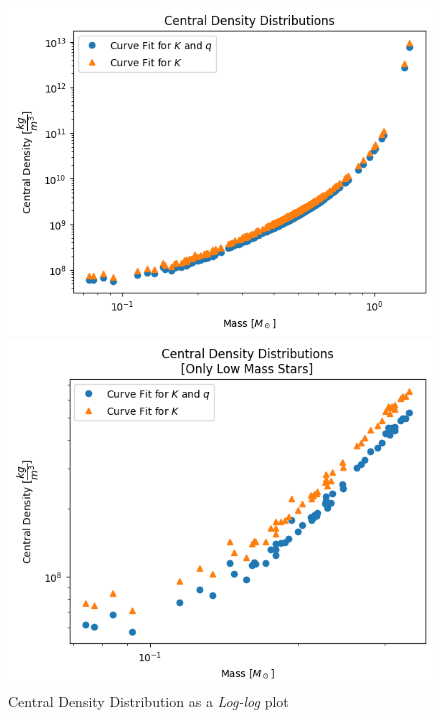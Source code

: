 \documentclass[letterpaper,12pt]{article}
\begin{document}
\begin{figure}[H]
\begin{minipage}{.5\textwidth}
\centerline{\includegraphics[width=\linewidth]{figures/1_n_ll_rho_m.png}}
\end{minipage}
\begin{minipage}{.5\textwidth}
\centerline{\includegraphics[width=\linewidth]{figures/2_n_ll_rho_m_.png}}
\end{minipage}
\caption{Central Density Distribution as a \textit{Log-log} plot}
\label{fig:12}
\end{figure}
\end{document}
